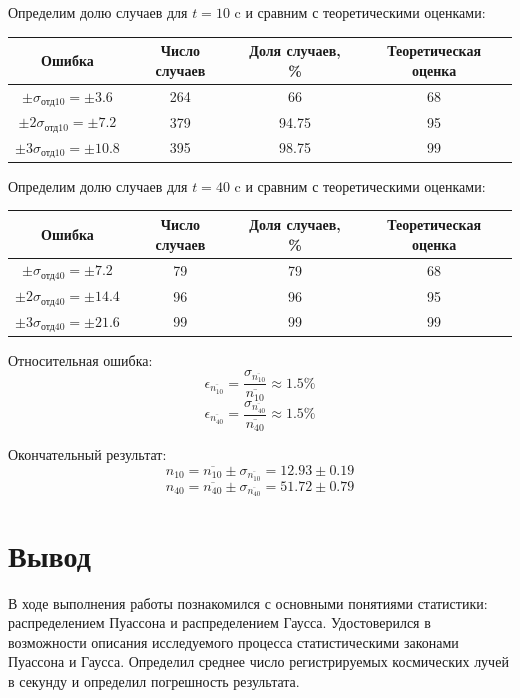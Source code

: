 \documentclass[a4paper,12pt]{article}
\begin{document}
Определим долю случаев для $t={\mbox{10 c}}$ и сравним с теоретическими оценками:
\begin{table}[H]
\centering
\begin{tabular}{|c|c|c|c|}
\hline
Ошибка & Число случаев & Доля случаев, \% & Теоретическая оценка \\
\hline
$\pm \sigma_{\text{отд10}}=\pm3.6$ & 264 & 66 & 68 \\
\hline
$\pm 2\sigma_{\text{отд10}}=\pm7.2$ & 379 & 94.75 & 95 \\
\hline
$\pm 3\sigma_{\text{отд10}}=\pm10.8$ & 395 & 98.75 & 99 \\
\hline
\end{tabular}
\end{table}

Определим долю случаев для $t={\mbox{40 c}}$ и сравним с теоретическими оценками:
\begin{table}[H]
\centering
\begin{tabular}{|c|c|c|c|}
\hline
Ошибка & Число случаев & Доля случаев, \% & Теоретическая оценка \\
\hline
$\pm \sigma_{\text{отд40}}=\pm7.2$ & 79 & 79 & 68 \\
\hline
$\pm 2\sigma_{\text{отд40}}=\pm14.4$ & 96 & 96 & 95 \\
\hline
$\pm 3\sigma_{\text{отд40}}=\pm21.6$ & 99 & 99 & 99 \\
\hline
\end{tabular}
\end{table}

Относительная ошибка:
\[\epsilon_{\overline{n_{10}}}=\frac{\sigma_{\overline{n_{10}}}}{\overline{n_{10}}}\approx1.5\%\]
\[\epsilon_{\overline{n_{40}}}=\frac{\sigma_{\overline{n_{40}}}}{\overline{n_{40}}}\approx1.5\%\]

Окончательный результат:
\[n_{10}=\overline{n_{10}}\pm\sigma_{\overline{n_{10}}}=12.93\pm0.19\]
\[n_{40}=\overline{n_{40}}\pm\sigma_{\overline{n_{40}}}=51.72\pm0.79\]

\section{Вывод}
В ходе выполнения работы познакомился с основными понятиями статистики: распределением Пуассона и распределением Гаусса. Удостоверился в возможности описания исследуемого процесса статистическими законами Пуассона и Гаусса. Определил среднее число регистрируемых космических лучей в секунду и определил погрешность результата.
\end{document}
